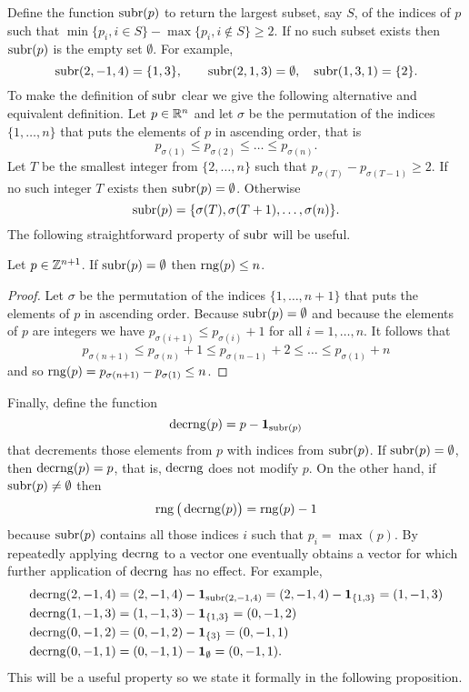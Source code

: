 \documentclass[final,leqno]{siamltex}
\begin{document}
Define the function $\operatorname{subr}(p)$ to return the largest subset, say $S$, of the indices of $p$ such that $\min\{p_i, i \in S\} - \max\{p_i, i \notin S\} \geq 2.$  If no such subset exists then $\operatorname{subr}(p)$ is the empty set $\emptyset$.  For example, 
\[
\operatorname{subr}(2,-1,4) = \{1,3\}, \qquad \operatorname{subr}(2,1,3) = \emptyset, \quad  \operatorname{subr}(1,3,1) = \{2\}.
\]  
To make the definition of $\operatorname{subr}$ clear we give the following alternative and equivalent definition.  Let $p \in {\mathbb R}^n$ and let $\sigma$ be the permutation of the indices $\{1,\dots,n\}$ that puts the elements of $p$ in ascending order, that is
\[
p_{\sigma(1)} \leq p_{\sigma(2)} \leq \dots \leq p_{\sigma(n)}.
\]  
Let $T$ be the smallest integer from $\{2,\dots,n\}$ such that $p_{\sigma(T)} - p_{\sigma(T-1)} \geq 2$.  If no such integer $T$ exists then $\operatorname{subr}(p) = \emptyset$.  Otherwise 
\[
\operatorname{subr}(p) =  \{ \sigma(T), \sigma(T+1), \dots, \sigma(n) \}.
\]
The following straightforward property of $\operatorname{subr}$ will be useful.

\begin{proposition}\label{prop:subrrngsmall}
Let $p \in {\mathbb Z}^{n+1}$.  If $\operatorname{subr}(p) = \emptyset$ then $\operatorname{rng}(p) \leq n$.
\end{proposition}
\begin{proof}
Let $\sigma$ be the permutation of the indices $\{1,\dots,n+1\}$ that puts the elements of $p$ in ascending order.  Because $\operatorname{subr}(p) = \emptyset$ and because the elements of $p$ are integers we have $p_{\sigma(i+1)} \leq p_{\sigma(i)} + 1$ for all $i=1,\dots,n$.  It follows that
\[
p_{\sigma(n+1)} \leq p_{\sigma(n)} + 1 \leq p_{\sigma(n-1)} + 2 \leq \dots \leq p_{\sigma(1)} + n
\]
and so $\operatorname{rng}(p) = p_{\sigma(n+1)} - p_{\sigma(1)} \leq n$.
\end{proof}

Finally, define the function
\[
\operatorname{decrng}(p) = p -  \boldsymbol{1}_{\operatorname{subr}(p)}
\]
that decrements those elements from $p$ with indices from $\operatorname{subr}(p)$.  If $\operatorname{subr}(p) = \emptyset$, then $\operatorname{decrng}(p) = p$, that is, $\operatorname{decrng}$ does not modify $p$.  On the other hand, if $\operatorname{subr}(p) \neq \emptyset$ then
\[
\operatorname{rng}\big(\operatorname{decrng}(p)\big) = \operatorname{rng}(p) - 1
\]
because $\operatorname{subr}(p)$ contains all those indices $i$ such that $p_i = \max(p)$.  By repeatedly applying $\operatorname{decrng}$ to a vector one eventually obtains a vector for which further application of $\operatorname{decrng}$ has no effect.  For example,
\begin{align*}
\operatorname{decrng}(2,-1,4) &= (2,-1,4) - \boldsymbol{1}_{\operatorname{subr}(2,-1,4)} = (2,-1,4) - \boldsymbol{1}_{\{1,3\}} = (1,-1,3) \\ 
\operatorname{decrng}(1,-1,3) &= (1,-1,3) - \boldsymbol{1}_{\{1,3\}} = (0,-1,2) \\ 
\operatorname{decrng}(0,-1,2) &= (0,-1,2) - \boldsymbol{1}_{\{3\}} = (0,-1,1) \\ 
\operatorname{decrng}(0,-1,1) &= (0,-1,1) - \boldsymbol{1}_{\emptyset} = (0,-1,1).
\end{align*}
This will be a useful property so we state it formally in the following proposition.
\end{document}
